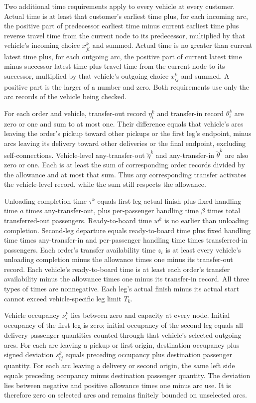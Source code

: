 \documentclass[10pt]{article}
\begin{document}
Two additional time requirements apply to every vehicle at every customer. Actual time is at least that customer's earliest time plus, for each incoming arc, the positive part of predecessor earliest time minus current earliest time plus reverse travel time from the current node to its predecessor, multiplied by that vehicle's incoming choice $x_{ji}^k$ and summed. Actual time is no greater than current latest time plus, for each outgoing arc, the positive part of current latest time minus successor latest time plus travel time from the current node to its successor, multiplied by that vehicle's outgoing choice $x_{ij}^k$ and summed. A positive part is the larger of a number and zero. Both requirements use only the arc records of the vehicle being checked.

For each order and vehicle, transfer-out record $\eta_i^k$ and transfer-in record $\theta_i^k$ are zero or one and sum to at most one. Their difference equals that vehicle's arcs leaving the order's pickup toward other pickups or the first leg's endpoint, minus arcs leaving its delivery toward other deliveries or the final endpoint, excluding self-connections. Vehicle-level any-transfer-out $\tilde\eta^k$ and any-transfer-in $\tilde\theta^k$ are also zero or one. Each is at least the sum of corresponding order records divided by the allowance and at most that sum. Thus any corresponding transfer activates the vehicle-level record, while the sum still respects the allowance.

Unloading completion time $\tau^k$ equals first-leg actual finish plus fixed handling time $a$ times any-transfer-out, plus per-passenger handling time $\beta$ times total transferred-out passengers. Ready-to-board time $w^k$ is no earlier than unloading completion. Second-leg departure equals ready-to-board time plus fixed handling time times any-transfer-in and per-passenger handling time times transferred-in passengers. Each order's transfer availability time $z_i$ is at least every vehicle's unloading completion minus the allowance times one minus its transfer-out record. Each vehicle's ready-to-board time is at least each order's transfer availability minus the allowance times one minus its transfer-in record. All three types of times are nonnegative. Each leg's actual finish minus its actual start cannot exceed vehicle-specific leg limit $T_k$.

Vehicle occupancy $\nu_i^k$ lies between zero and capacity at every node. Initial occupancy of the first leg is zero; initial occupancy of the second leg equals all delivery passenger quantities counted through that vehicle's selected outgoing arcs. For each arc leaving a pickup or first origin, destination occupancy plus signed deviation $s_{ij}^k$ equals preceding occupancy plus destination passenger quantity. For each arc leaving a delivery or second origin, the same left side equals preceding occupancy minus destination passenger quantity. The deviation lies between negative and positive allowance times one minus arc use. It is therefore zero on selected arcs and remains finitely bounded on unselected arcs.
\end{document}
